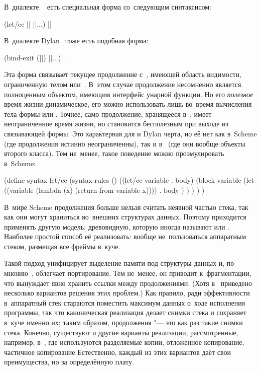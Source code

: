 В~диалекте {\EuLisp}~\cite{pe92} есть специальная форма  со~следующим
синтаксисом:

\begin{code:lisp}
(let/cc || ||...)  |\dialect{\EuLisp}|
\end{code:lisp}

В~диалекте Dylan~\cite{app92b} тоже есть подобная форма:

\begin{code:lisp}
(bind-exit (||) ||...)  ||
\end{code:lisp}

\noindent
Эта форма связывает текущее продолжение с~, имеющей область
видимости, ограниченную телом  или~. В~этом случае
продолжение несомненно является полноценным объектом, имеющим интерфейс унарной
функции. Но его \emph{полезное} время жизни динамическое, его можно использовать
лишь во~время вычисления тела формы  или . Точнее, само
продолжение, хранящееся в~, имеет неограниченное время жизни, но
становится бесполезным при выходе из связывающей формы. Это характерная для
{\EuLisp} и Dylan черта, но её нет как в~Scheme (где продолжения истинно
неограниченны), так и в~{\CommonLisp} (где они вообще объекты второго класса).
Тем не~менее, такое поведение можно проэмулировать в~Scheme:

\begin{code:lisp}
(define-syntax let/cc
  (syntax-rules ()
    ((let/cc variable . body)
     (block variable
       (let ((variable (lambda (x) (return-from variable x))))
         . body ) ) ) ) )
\end{code:lisp}

В~мире Scheme продолжения больше нельзя считать неявной частью стека, так как
они могут храниться во~внешних структурах данных. Поэтому приходится применять
другую модель: древовидную, которую иногда называют  или
. Наиболее простой способ её реализовать: вообще
не~пользоваться аппаратным стеком, размещая все фреймы в~куче.

Такой подход унифицирует выделение памяти под структуры данных и, по
мнению~\cite{as94}, облегчает портирование. Тем не~менее, он приводит
к~фрагментации, что вынуждает явно хранить ссылки между продолжениями. (Хотя
в~\cite{mb93} приведено несколько вариантов решения этих проблем.) Как правило,
ради эффективности в~аппаратный стек стараются поместить максимум данных о~ходе
исполнения программы, так что каноническая реализация  делает снимки
стека и сохраняет в~куче именно их; таким образом, продолжения "--- это как раз
такие снимки стека. Конечно, существуют и другие варианты реализации,
рассмотренные, например, в~\cite{cho88, hdb90}, где используются разделяемые
копии, отложенное копирование, частичное копирование {\itd} Естественно,
каждый из этих вариантов даёт свои преимущества, но за определённую плату.

